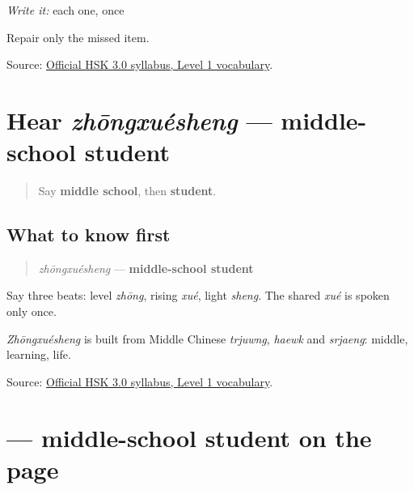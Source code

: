 \emph{Write it:} each one, once

Repair only the missed item.

\begin{tcolorbox}[breakable,colback=teal!4,colframe=teal!35!black,title={Before you move on}]
Source: \href{https://hsk.cn-bj.ufileos.com/3.0/\%E6\%96\%B0\%E7\%89\%88HSK\%E8\%80\%83\%E8\%AF\%95\%E5\%A4\%A7\%E7\%BA\%B21219.pdf}{Official HSK 3.0 syllabus, Level 1 vocabulary}.
\end{tcolorbox}
\section[zhōngxuésheng]{Hear \emph{zhōngxuésheng} — middle-school student}

\label{lesson:ZH-C15-hear-zhongxuesheng}



\begin{quote}
Say \textbf{middle school}, then \textbf{student}.
\end{quote}

\subsection*{What to know first}
\begin{quote}
\emph{zhōngxuésheng} — \textbf{middle-school student}
\end{quote}

Say three beats: level \emph{zhōng}, rising \emph{xué}, light \emph{sheng}. The shared \emph{xué} is spoken only once.

\emph{Zhōngxuésheng} is built from Middle Chinese \emph{trjuwng}, \emph{haewk} and \emph{srjaeng}: middle, learning, life.

\begin{tcolorbox}[breakable,colback=teal!4,colframe=teal!35!black,title={Before you move on}]
Source: \href{https://hsk.cn-bj.ufileos.com/3.0/\%E6\%96\%B0\%E7\%89\%88HSK\%E8\%80\%83\%E8\%AF\%95\%E5\%A4\%A7\%E7\%BA\%B21219.pdf}{Official HSK 3.0 syllabus, Level 1 vocabulary}.
\end{tcolorbox}
\section[\texorpdfstring{\zh{中学生} (zhōngxuésheng)}{中学生 (zhōngxuésheng)}]{ — middle-school student on the page}

\label{lesson:ZH-C15-zhongxuesheng}



